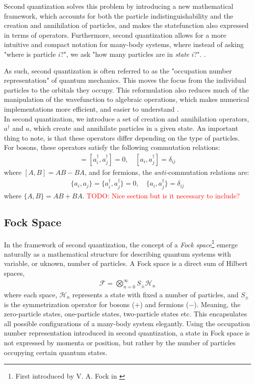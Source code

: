\documentclass{subfiles}
\begin{document}
Second quantization solves this problem by introducing a new mathematical framework, which accounts for both the particle indistinguishability and the creation and annihilation of particles, and makes the statefunction also expressed in terms of operators. Furthermore, second quantization allows for a more intuitive and compact notation for many-body systems, where instead of asking "where is particle $i$?", we ask "how many particles are in \emph{state} $i$?". \cite{szabo1996modern, shavitt2009many, helgaker2013molecular}.

As such, second quantization is often referred to as the "occupation number representation" of quantum mechanics. This moves the focus from the individual particles to the orbitals they occupy. This reformulation also reduces much of the manipulation of the wavefunction to algebraic operations, which makes numerical implementations more efficient, and easier to understand \cite{helgaker2013molecular}.
\\ 

In second quantization, we introduce a set of creation and annihilation operators, $a^\dagger$ and $a$, which create and annihilate particles in a given state. An important thing to note, is that these operators differ depending on the type of particles. For bosons, these operators satisfy the following commutation relations:
\begin{align}
    [a_i, a_j] = [a^\dagger_i, a^\dagger_j] = 0, \quad [a_i, a^\dagger_j] = \delta_{ij}\label{eq:commutation}
\end{align}
where $[A, B] = AB - BA$, and for fermions, the \emph{anti-}commutation relations are:
\begin{align}
    \{a_i, a_j\} = \{a^\dagger_i, a^\dagger_j\} = 0, \quad \{a_i, a^\dagger_j\} = \delta_{ij}\label{eq:anti_commutation}
\end{align}
where $\{A, B\} = AB + BA$.
\textcolor{red}{TODO: Nice section but is it necessary to include? }
\subsection{Fock Space}
In the framework of second quantization, the concept of a \emph{Fock space}\footnote{First introduced by V. A. Fock in \cite{fock1932konfigurationsraum}} emerge naturally as a mathematical structure for describing quantum systems with variable, or uknown, number of particles. A Fock space is a direct sum of Hilbert spaces, 
\begin{align*}
    \mathcal{F} = \bigotimes_{n=0}^\infty S_{\pm} \mathcal{H}_n
\end{align*}
where each space, $\mathcal{H}_n$ represents a state with fixed a number of particles, and $S_{\pm}$ is the symmetrization operator for bosons ($+$) and fermions ($-$). Meaning, the zero-particle states, one-particle states, two-particle states etc. This encapsulates all possible configurations of a many-body system elegantly. Using the occupation number representation introduced in second quantization, a state in Fock space is not expressed by momenta or position, but rather by the number of particles occupying certain quantum states\cite{helgaker2013molecular}. 
\\
\end{document}
